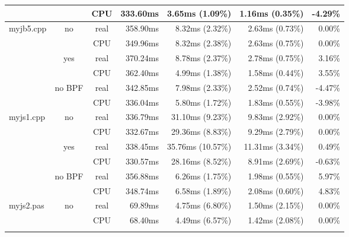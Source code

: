 \documentclass[en]{pracamgr}
\begin{document}
\begin{appendices}
\begin{small}
\begin{longtable}{|l|c|c|r|r|r|r|}
                            &                         & CPU  & 333.60ms & 3.65ms (1.09\%) & 1.16ms (0.35\%) & -4.29\% \\
\hline
\multirow{6}{*}{myjb5.cpp}  & \multirow{2}{*}{no}     & real & 358.90ms & 8.32ms (2.32\%) & 2.63ms (0.73\%) & 0.00\% \\*
                            &                         & CPU  & 349.96ms & 8.32ms (2.38\%) & 2.63ms (0.75\%) & 0.00\% \\*
                            \cline{2-7}
                            & \multirow{2}{*}{yes}    & real & 370.24ms & 8.78ms (2.37\%) & 2.78ms (0.75\%) & 3.16\% \\*
                            &                         & CPU  & 362.40ms & 4.99ms (1.38\%) & 1.58ms (0.44\%) & 3.55\% \\*
                            \cline{2-7}
                            & \multirow{2}{*}{no BPF} & real & 342.85ms & 7.98ms (2.33\%) & 2.52ms (0.74\%) & -4.47\% \\*
                            &                         & CPU  & 336.04ms & 5.80ms (1.72\%) & 1.83ms (0.55\%) & -3.98\% \\
\hline
\multirow{6}{*}{myjs1.cpp}  & \multirow{2}{*}{no}     & real & 336.79ms & 31.10ms (9.23\%) & 9.83ms (2.92\%) & 0.00\% \\*
                            &                         & CPU  & 332.67ms & 29.36ms (8.83\%) & 9.29ms (2.79\%) & 0.00\% \\*
                            \cline{2-7}
                            & \multirow{2}{*}{yes}    & real & 338.45ms & 35.76ms (10.57\%) & 11.31ms (3.34\%) & 0.49\% \\*
                            &                         & CPU  & 330.57ms & 28.16ms (8.52\%) & 8.91ms (2.69\%) & -0.63\% \\*
                            \cline{2-7}
                            & \multirow{2}{*}{no BPF} & real & 356.88ms & 6.26ms (1.75\%) & 1.98ms (0.55\%) & 5.97\% \\*
                            &                         & CPU  & 348.74ms & 6.58ms (1.89\%) & 2.08ms (0.60\%) & 4.83\% \\
\hline
\multirow{6}{*}{myjs2.pas}  & \multirow{2}{*}{no}     & real & 69.89ms & 4.75ms (6.80\%) & 1.50ms (2.15\%) & 0.00\% \\*
                            &                         & CPU  & 68.40ms & 4.49ms (6.57\%) & 1.42ms (2.08\%) & 0.00\% \\*

\end{longtable}
\end{small}
\end{appendices}
\end{document}
